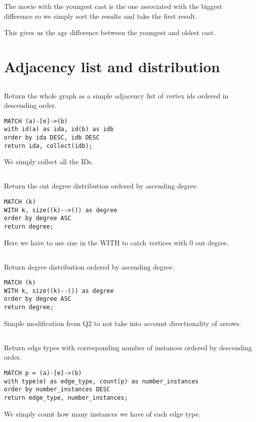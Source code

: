 The movie with the youngest cast is the one associated with the biggest difference so we simply sort the results and take the first result.

This gives us the age difference between the youngest and oldest cast.

\section{Adjacency list and distribution}
\subsection{}
Return the whole graph as a simple adjacency list of vertex ids ordered in descending order.

\begin{verbatim}
MATCH (a)-[e]->(b)
with id(a) as ida, id(b) as idb
order by ida DESC, idb DESC
return ida, collect(idb);
\end{verbatim}

We simply collect all the IDs.

\subsection{}
Return the out degree distribution ordered by ascending degree.

\begin{verbatim}
MATCH (k)
WITH k, size((k)-->()) as degree
order by degree ASC
return degree;
\end{verbatim}

Here we have to use size in the WITH to catch vertices with 0 out degree.

\subsection{}
Return degree distribution ordered by ascending degree.

\begin{verbatim}
MATCH (k)
WITH k, size((k)--()) as degree
order by degree ASC
return degree;
\end{verbatim}

Simple modification from Q2 to not take into account directionality of arrows.

\subsection{}
Return edge types with corresponding number of instances ordered by descending order.

\begin{verbatim}
MATCH p = (a)-[e]->(b)
with type(e) as edge_type, count(p) as number_instances
order by number_instances DESC
return edge_type, number_instances;
\end{verbatim}

We simply count how many instances we have of each edge type.

